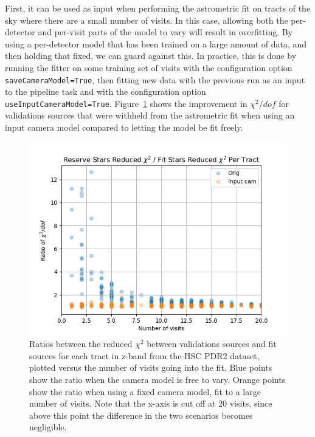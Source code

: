 \documentclass[DM,authoryear,toc]{lsstdoc}
\begin{document}
First, it can be used as input when performing the astrometric fit on tracts of the sky where there are a small number of visits. In this case, allowing both the per-detector and per-visit parts of the model to vary will result in overfitting. By using a per-detector model that has been trained on a large amount of data, and then holding that fixed, we can guard against this. In practice, this is done by running the fitter on some training set of visits with the configuration option \texttt{saveCameraModel=True}, then fitting new data with the previous run as an input to the pipeline task and with the configuration option \texttt{useInputCameraModel=True}. Figure~\ref{fig:inputcam} shows the improvement in $\chi^2 / dof$ for validations sources that were withheld from the astrometric fit when using an input camera model compared to letting the model be fit freely.
\begin{figure}
\includegraphics[width=\columnwidth]{figures/inputCamera_demo.png}
\caption{Ratios between the reduced $\chi^2$ between validations sources and fit sources for each tract in z-band from the HSC PDR2 dataset, plotted versus the number of visits going into the fit. Blue points show the ratio when the camera model is free to vary. Orange points show the ratio when using a fixed camera model, fit to a large number of visits. Note that the x-axis is cut off at $20$ visits, since above this point the difference in the two scenarios becomes negligible.}
\label{fig:inputcam}
\end{figure}
\end{document}

